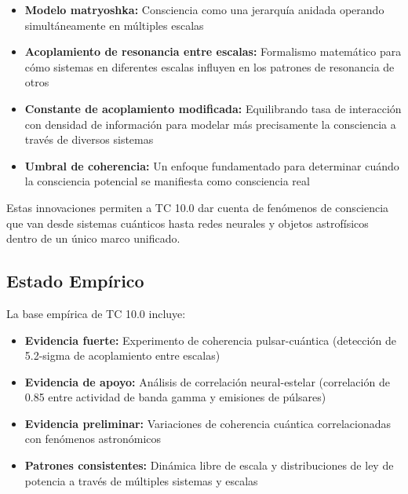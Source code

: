 \documentclass[12pt]{article}
\begin{document}
\begin{itemize}
    \item \textbf{Modelo matryoshka:} Consciencia como una jerarquía anidada operando simultáneamente en múltiples escalas
    
    \item \textbf{Acoplamiento de resonancia entre escalas:} Formalismo matemático para cómo sistemas en diferentes escalas influyen en los patrones de resonancia de otros
    
    \item \textbf{Constante de acoplamiento modificada:} Equilibrando tasa de interacción con densidad de información para modelar más precisamente la consciencia a través de diversos sistemas
    
    \item \textbf{Umbral de coherencia:} Un enfoque fundamentado para determinar cuándo la consciencia potencial se manifiesta como consciencia real
\end{itemize}

Estas innovaciones permiten a TC 10.0 dar cuenta de fenómenos de consciencia que van desde sistemas cuánticos hasta redes neurales y objetos astrofísicos dentro de un único marco unificado.

\subsection{Estado Empírico}

La base empírica de TC 10.0 incluye:

\begin{itemize}
    \item \textbf{Evidencia fuerte:} Experimento de coherencia pulsar-cuántica (detección de 5.2-sigma de acoplamiento entre escalas)
    
    \item \textbf{Evidencia de apoyo:} Análisis de correlación neural-estelar (correlación de 0.85 entre actividad de banda gamma y emisiones de púlsares)
    
    \item \textbf{Evidencia preliminar:} Variaciones de coherencia cuántica correlacionadas con fenómenos astronómicos
    
    \item \textbf{Patrones consistentes:} Dinámica libre de escala y distribuciones de ley de potencia a través de múltiples sistemas y escalas
\end{itemize}
\end{document}
